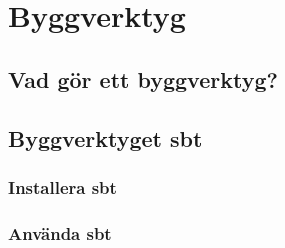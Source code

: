 
\chapter{Byggverktyg}

\section{Vad gör ett byggverktyg?}

\section{Byggverktyget sbt}

\subsection{Installera sbt}

\subsection{Använda sbt}